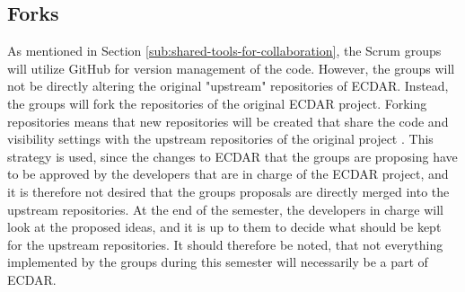 \subsection{Forks}
As mentioned in Section \ref{sub:shared-tools-for-collaboration}, the Scrum groups will utilize GitHub for version management of the code.
However, the groups will not be directly altering the original "upstream" repositories of ECDAR.
Instead, the groups will fork the repositories of the original ECDAR project. Forking repositories means that new repositories will be created that share the code and visibility settings with the upstream repositories of the original project \cite{github_fork}.
This strategy is used, since the changes to ECDAR that the groups are proposing have to be approved by the developers that are in charge of the ECDAR project, and it is therefore not desired that the groups proposals are directly merged into the upstream repositories.
At the end of the semester, the developers in charge will look at the proposed ideas, and it is up to them to decide what should be kept for the upstream repositories.
It should therefore be noted, that not everything implemented by the groups during this semester will necessarily be a part of ECDAR.